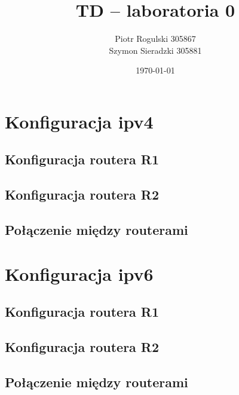 \documentclass[a4paper,12pt,notitlepage]{article}
\title{\textbf{TD -- laboratoria 0}}
\author{Piotr Rogulski 305867 \\ Szymon Sieradzki 305881}
\date{\today}
\begin{document}
\maketitle
\section{Konfiguracja ipv4}
\subsection{Konfiguracja routera R1}
\subsection{Konfiguracja routera R2}
\subsection{Połączenie między routerami}
\section{Konfiguracja ipv6}
\subsection{Konfiguracja routera R1}
\subsection{Konfiguracja routera R2}
\subsection{Połączenie między routerami}
\end{document}
